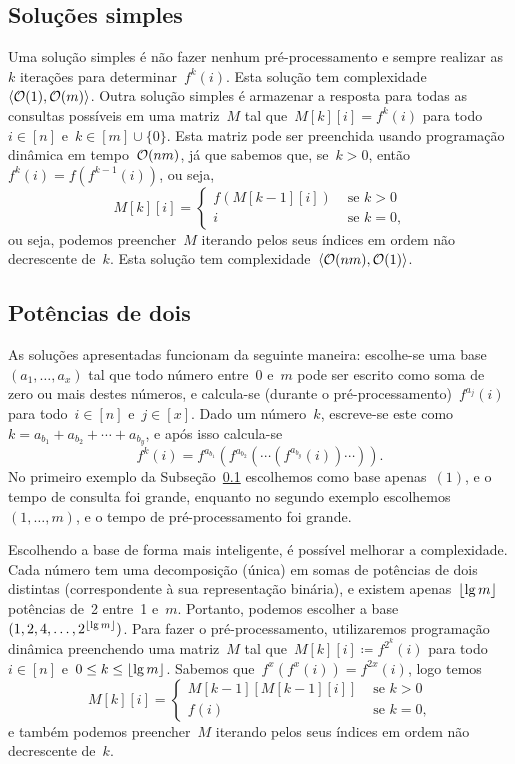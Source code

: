 \documentclass[main.tex]{subfiles}
\begin{document}
\subsection{Soluções simples} \label{subsec:anc_sol_simples}

Uma solução simples é não fazer nenhum pré-processamento e sempre realizar as~$k$ iterações para determinar~$f^k(i)$. Esta solução tem complexidade~$\langle\mathcal{O}(1),\mathcal{O}(m)\rangle$. Outra solução simples é armazenar a resposta para todas as consultas possíveis em uma matriz~$M$ tal que~$M[k][i] = f^k(i)$ para todo~$i \in [n]$ e~$k \in [m] \cup \{0\}$. Esta matriz pode ser preenchida usando programação dinâmica em tempo~$\mathcal{O}(nm)$, já que sabemos que, se~$k > 0$, então~$f^k(i) = f(f^{k-1}(i))$, ou seja,
$$M[k][i] = \left\{
	\begin{array}{ll}
		f(M[k - 1][i]) & \text{ se $k > 0$} \\
		i & \text{ se $k = 0$,}
	\end{array}
	\right.
$$
ou seja, podemos preencher~$M$ iterando pelos seus índices em ordem não decrescente de~$k$. Esta solução tem complexidade~$\langle\mathcal{O}(nm), \mathcal{O}(1)\rangle$.

\subsection{Potências de dois} \label{subsec:pot2}

As soluções apresentadas funcionam da seguinte maneira: escolhe-se uma base~$(a_1, \ldots, a_x)$ tal que todo número entre~0 e~$m$ pode ser escrito como soma de zero ou mais destes números, e calcula-se (durante o pré-processamento)~$f^{a_j}(i)$ para todo~$i \in [n]$ e~$j \in [x]$. Dado um número~$k$, escreve-se este como~$k = a_{b_1} + a_{b_2} + \cdots + a_{b_y}$, e após isso calcula-se
$$f^k(i) = f^{a_{b_1}}(f^{a_{b_2}}(\cdots(f^{a_{b_y}}(i))\cdots)).$$
No primeiro exemplo da Subseção~\ref{subsec:anc_sol_simples} escolhemos como base apenas~$(1)$, e o tempo de consulta foi grande, enquanto no segundo exemplo escolhemos~$(1, \ldots, m)$, e o tempo de pré-processamento foi grande.

Escolhendo a base de forma mais inteligente, é possível melhorar a complexidade. Cada número tem uma decomposição (única) em somas de potências de dois distintas (correspondente à sua representação binária), e existem apenas~$\lfloor\lg m\rfloor$ potências de~2 entre~1 e~$m$. Portanto, podemos escolher a base~${(1, 2, 4, \ldots, 2^{\lfloor\lg m\rfloor})}$. Para fazer o pré-processamento, utilizaremos programação dinâmica preenchendo uma matriz~$M$ tal que~${M[k][i] \coloneqq f^{2^k}(i)}$ para todo~$i \in [n]$ e~$0 \leq k \leq \lfloor\lg m\rfloor$. Sabemos que~$f^x(f^x(i)) = f^{2x}(i)$, logo temos
$$M[k][i] = \left\{
	\begin{array}{ll}
		M[k-1][M[k - 1][i]] & \text{ se $k > 0$} \\
		f(i) & \text{ se $k = 0$,}
	\end{array}
	\right.
$$
e também podemos preencher~$M$ iterando pelos seus índices em ordem não decrescente de~$k$.
\end{document}

